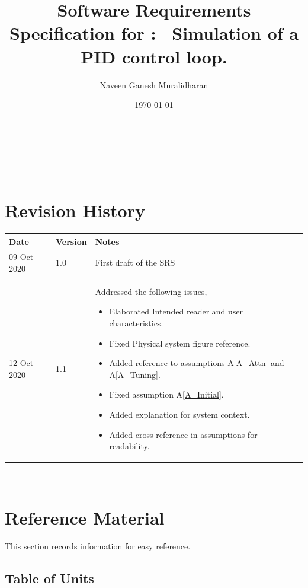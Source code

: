 \documentclass[12pt]{article}
\newcommand{\aref}[1]{A\ref{#1}}
\begin{document}
\title{Software Requirements Specification for \progname: \
Simulation of a PID control loop.} 
\author{Naveen Ganesh Muralidharan}
\date{\today}
	
\maketitle

~\newpage


\tableofcontents

~\newpage

\section*{Revision History}

\begin{tabularx}{\textwidth}{p{3cm}p{2cm}X}
\toprule {\bf Date} & {\bf Version} & {\bf Notes}\\
\midrule
09-Oct-2020 & 1.0 & First draft of the SRS\\
12-Oct-2020 & 1.1 & Addressed the following issues,
\begin{itemize}
\item Elaborated Intended reader and user characteristics.
\item Fixed Physical system figure reference.
\item Added reference to assumptions \aref{A_Attn} and \aref{A_Tuning}.
\item Fixed assumption \aref{A_Initial}.
\item Added explanation for system context.
\item Added cross reference in assumptions for readability.
\end{itemize}\\
\bottomrule
\end{tabularx}

~\newpage

\section{Reference Material}

This section records information for easy reference.

\subsection{Table of Units}
\end{document}
